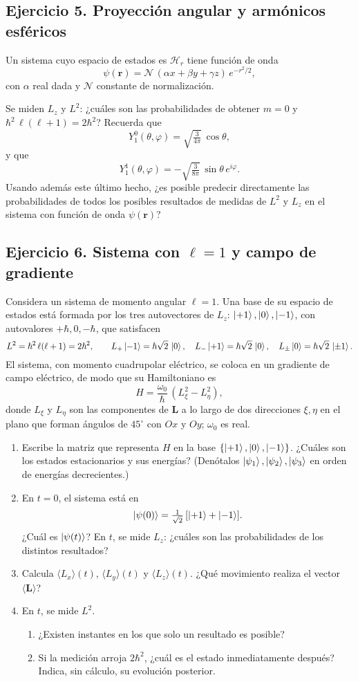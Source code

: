 \documentclass[a4paper,11pt]{article}
\begin{document}
\subsection*{Ejercicio 5. Proyección angular y armónicos esféricos}
Un sistema cuyo espacio de estados es $\mathcal{H}_r$ tiene función de onda
\[
\psi(\mathbf{r})=\mathcal{N}\,(\alpha x+\beta y+\gamma z)\,e^{-r^2/2},
\]
con $\alpha$ real dada y $\mathcal{N}$ constante de normalización.

Se miden $L_z$ y $L^2$: ¿cuáles son las probabilidades de obtener $m=0$ y $\hbar^2\,\ell(\ell+1)=2\hbar^2$? Recuerda que
\[
Y_1^{0}(\theta,\varphi)=\sqrt{\tfrac{3}{4\pi}}\,\cos\theta,
\]
y que
\[
Y_1^{1}(\theta,\varphi)=-\sqrt{\tfrac{3}{8\pi}}\,\sin\theta\,e^{i\varphi}.
\]
Usando además este último hecho, ¿es posible predecir directamente las probabilidades de todos los posibles resultados de medidas de $L^2$ y $L_z$ en el sistema con función de onda $\psi(\mathbf{r})$?

\subsection*{Ejercicio 6. Sistema con $\ell=1$ y campo de gradiente}
Considera un sistema de momento angular $\ell=1$. Una base de su espacio de estados está formada por los tres autovectores de $L_z$: $\ket{+1},\ket{0},\ket{-1}$, con autovalores $+\hbar,0,-\hbar$, que satisfacen
\[
L^2=\hbar^2\,\ell(\ell+1)=2\hbar^2,\qquad L_+\ket{-1}=\hbar\sqrt{2}\,\ket{0},\quad L_-\ket{+1}=\hbar\sqrt{2}\,\ket{0},\quad L_\pm\ket{0}=\hbar\sqrt{2}\,\ket{\pm1}.
\]
El sistema, con momento cuadrupolar eléctrico, se coloca en un gradiente de campo eléctrico, de modo que su Hamiltoniano es
\[
H=\frac{\omega_0}{\hbar}\,(L_\xi^2-L_\eta^2),
\]
donde $L_\xi$ y $L_\eta$ son las componentes de $\mathbf{L}$ a lo largo de dos direcciones $\xi,\eta$ en el plano que forman ángulos de $45^\circ$ con $Ox$ y $Oy$; $\omega_0$ es real.

\begin{enumerate}
	\item Escribe la matriz que representa $H$ en la base $\{\ket{+1},\ket{0},\ket{-1}\}$. ¿Cuáles son los estados estacionarios y sus energías? (Denótalos $\ket{\psi_1},\ket{\psi_2},\ket{\psi_3}$ en orden de energías decrecientes.)
	\item En $t=0$, el sistema está en
	\[
	\ket{\psi(0)}=\tfrac{1}{\sqrt{2}}\,[\ket{+1}+\ket{-1}].
	\]
	¿Cuál es $\ket{\psi(t)}$? En $t$, se mide $L_z$: ¿cuáles son las probabilidades de los distintos resultados?
	\item Calcula $\langle L_x\rangle(t)$, $\langle L_y\rangle(t)$ y $\langle L_z\rangle(t)$. ¿Qué movimiento realiza el vector $\langle\mathbf{L}\rangle$?
	\item En $t$, se mide $L^2$.
	\begin{enumerate}
		\item ¿Existen instantes en los que solo un resultado es posible?
		\item Si la medición arroja $2\hbar^2$, ¿cuál es el estado inmediatamente después? Indica, sin cálculo, su evolución posterior.
	\end{enumerate}
\end{enumerate}
\end{document}
